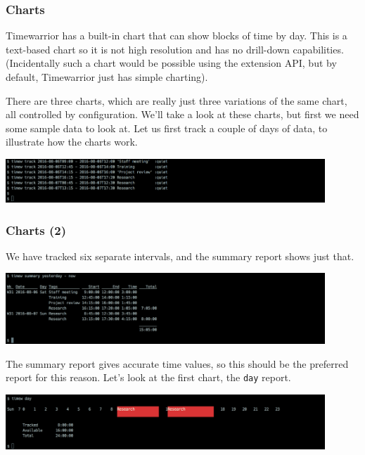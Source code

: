 \documentclass[t,handout]{beamer}
\begin{document}
\begin{frame}[fragile]\frametitle{Charts}
    Timewarrior has a built-in chart that can show blocks of time by day. This is a text-based chart so it is not high resolution and has no drill-down capabilities. (Incidentally such a chart would be possible using the extension API, but by default, Timewarrior just has simple charting).

    There are three charts, which are really just three variations of the same chart, all controlled by configuration. We'll take a look at these charts, but first we need some sample data to look at.  Let us first track a couple of days of data, to illustrate how the charts work.

    \includegraphics[width=12cm]{images/tutorial24.png}
\end{frame}

\begin{frame}[fragile]\frametitle{Charts (2)}
    We have tracked six separate intervals, and the summary report shows just that.

    \includegraphics[width=12cm]{images/tutorial25.png}

    The summary report gives accurate time values, so this should be the preferred report for this reason. Let's look at the first chart, the \verb=day= report.

    \includegraphics[width=12cm]{images/tutorial26.png}
\end{frame}
\end{document}
